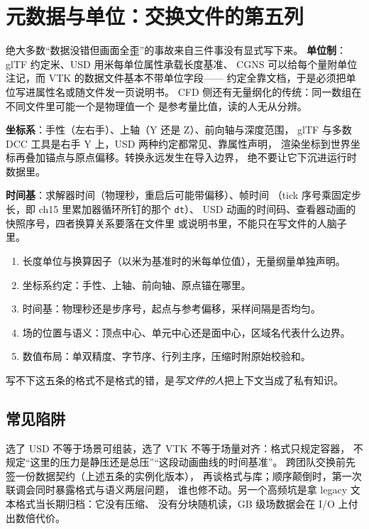 \documentclass[12pt,a4paper,fontset=fandol]{ctexbook}
\newcommand{\Tp}[1]{\texttt{#1}}
\begin{document}
\section{元数据与单位：交换文件的第五列}
\label{sec:ch16-units}

绝大多数``数据没错但画面全歪''的事故来自三件事没有显式写下来。
\textbf{单位制}：glTF 约定米、USD 用米每单位属性承载长度基准、
CGNS 可以给每个量附单位注记，而 VTK 的数据文件基本不带单位字段——
约定全靠文档，于是必须把单位写进属性名或随文件发一页说明书。
CFD 侧还有无量纲化的传统：同一数组在不同文件里可能一个是物理值一个
是参考量比值，读的人无从分辨。

\textbf{坐标系}：手性（左右手）、上轴（Y 还是 Z）、前向轴与深度范围，
glTF 与多数 DCC 工具是右手 Y 上，USD 两种约定都常见、靠属性声明，
渲染坐标到世界坐标再叠加锚点与原点偏移。转换永远发生在导入边界，
绝不要让它下沉进运行时数据里。

\textbf{时间基}：求解器时间（物理秒，重启后可能带偏移）、帧时间
（tick 序号乘固定步长，即 ch15 里累加器循环所钉的那个 \Tp{dt}）、
USD 动画的时间码、查看器动画的快照序号，四者换算关系要落在文件里
或说明书里，不能只在写文件的人脑子里。

\begin{guideline}[title={交换格式里必须显式写下的五件事}]
\begin{enumerate}
  \item 长度单位与换算因子（以米为基准时的米每单位值），无量纲量单独声明。
  \item 坐标系约定：手性、上轴、前向轴、原点锚在哪里。
  \item 时间基：物理秒还是步序号，起点与参考偏移，采样间隔是否均匀。
  \item 场的位置与语义：顶点中心、单元中心还是面中心，区域名代表什么边界。
  \item 数值布局：单双精度、字节序、行列主序，压缩时附原始校验和。
\end{enumerate}
写不下这五条的格式不是格式的错，是\emph{写文件的人}把上下文当成了私有知识。
\end{guideline}

\subsection*{常见陷阱}
\begin{warning}[title={把格式选择当成数据契约}]
选了 USD 不等于场景可组装，选了 VTK 不等于场量对齐：格式只规定容器，
不规定``这里的压力是静压还是总压''``这段动画曲线的时间基准''。
跨团队交换前先签一份数据契约（上述五条的实例化版本），
再谈格式与库；顺序颠倒时，第一次联调会同时暴露格式与语义两层问题，
谁也修不动。另一个高频坑是拿 legacy 文本格式当长期归档：它没有压缩、
没有分块随机读，GB 级场数据会在 I/O 上付出数倍代价。
\end{warning}
\end{document}
